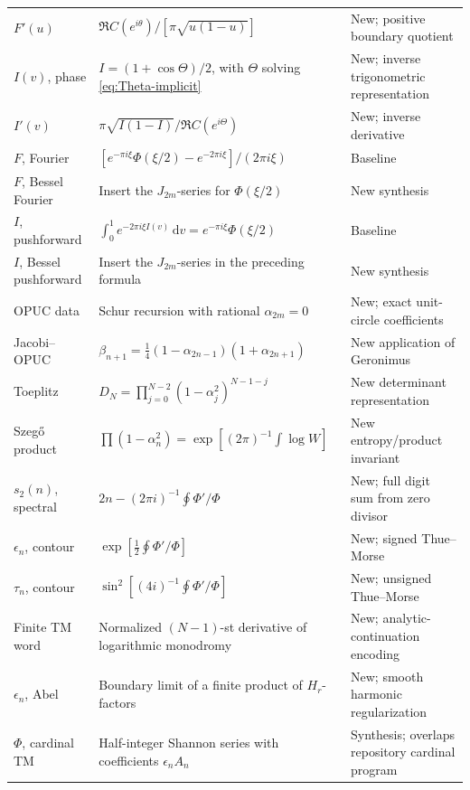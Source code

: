 \documentclass[11pt,oneside]{article}
\theoremstyle{definition}
\newcommand{\dd}{\,\mathrm d}
\begin{document}
\begin{longtable}{p{}p{}p{}}
\(F'(u)\) &
\(\Re C(e^{i\theta})/[\pi\sqrt{u(1-u)}]\) &
New; positive boundary quotient\\

\(I(v)\), phase &
\(I=(1+\cos\Theta)/2\), with \(\Theta\) solving \eqref{eq:Theta-implicit} &
New; inverse trigonometric representation\\

\(I'(v)\) &
\(\pi\sqrt{I(1-I)}/\Re C(e^{i\Theta})\) &
New; inverse derivative\\

\(F\), Fourier &
\([e^{-\pi i\xi}\Phi(\xi/2)-e^{-2\pi i\xi}]/(2\pi i\xi)\) &
Baseline\\

\(F\), Bessel Fourier &
Insert the \(J_{2m}\)-series for \(\Phi(\xi/2)\) &
New synthesis\\

\(I\), pushforward &
\(\int_0^1e^{-2\pi i\xi I(v)}\dd v=e^{-\pi i\xi}\Phi(\xi/2)\) &
Baseline\\

\(I\), Bessel pushforward &
Insert the \(J_{2m}\)-series in the preceding formula &
New synthesis\\

OPUC data &
Schur recursion with rational \(\alpha_{2m}=0\) &
New; exact unit-circle coefficients\\

Jacobi--OPUC &
\(\beta_{n+1}=\tfrac14(1-\alpha_{2n-1})(1+\alpha_{2n+1})\) &
New application of Geronimus\\

Toeplitz &
\(D_N=\prod_{j=0}^{N-2}(1-\alpha_j^2)^{N-1-j}\) &
New determinant representation\\

Szeg\H{o} product &
\(\prod(1-\alpha_n^2)=\exp[(2\pi)^{-1}\int\log W]\) &
New entropy/product invariant\\

\(s_2(n)\), spectral &
\(2n-(2\pi i)^{-1}\oint\Phi'/\Phi\) &
New; full digit sum from zero divisor\\

\(\epsilon_n\), contour &
\(\exp[\tfrac12\oint\Phi'/\Phi]\) &
New; signed Thue--Morse\\

\(\tau_n\), contour &
\(\sin^2[(4i)^{-1}\oint\Phi'/\Phi]\) &
New; unsigned Thue--Morse\\

Finite TM word &
Normalized \((N-1)\)-st derivative of logarithmic monodromy &
New; analytic-continuation encoding\\

\(\epsilon_n\), Abel &
Boundary limit of a finite product of \(H_r\)-factors &
New; smooth harmonic regularization\\

\(\Phi\), cardinal TM &
Half-integer Shannon series with coefficients \(\epsilon_nA_n\) &
Synthesis; overlaps repository cardinal program\\
\end{longtable}
\normalsize
\end{document}
